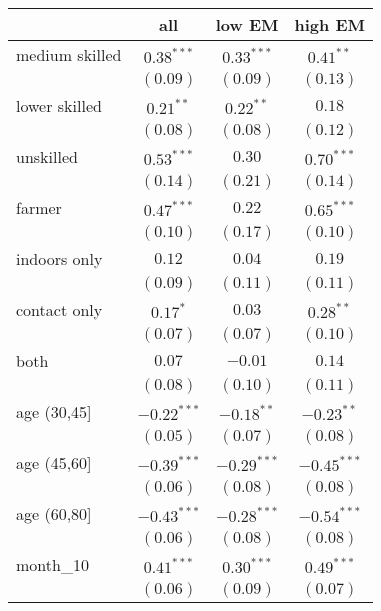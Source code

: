 
\begin{table}[h!]
\begin{center}
\begin{small}
\begin{tabular}{l c c c}
\hline
 & all & low EM & high EM \\
\hline
medium skilled & $0.38^{***}$  & $0.33^{***}$  & $0.41^{**}$   \\
               & $(0.09)$      & $(0.09)$      & $(0.13)$      \\
lower skilled  & $0.21^{**}$   & $0.22^{**}$   & $0.18$        \\
               & $(0.08)$      & $(0.08)$      & $(0.12)$      \\
unskilled      & $0.53^{***}$  & $0.30$        & $0.70^{***}$  \\
               & $(0.14)$      & $(0.21)$      & $(0.14)$      \\
farmer         & $0.47^{***}$  & $0.22$        & $0.65^{***}$  \\
               & $(0.10)$      & $(0.17)$      & $(0.10)$      \\
indoors only   & $0.12$        & $0.04$        & $0.19$        \\
               & $(0.09)$      & $(0.11)$      & $(0.11)$      \\
contact only   & $0.17^{*}$    & $0.03$        & $0.28^{**}$   \\
               & $(0.07)$      & $(0.07)$      & $(0.10)$      \\
both           & $0.07$        & $-0.01$       & $0.14$        \\
               & $(0.08)$      & $(0.10)$      & $(0.11)$      \\
age (30,45]    & $-0.22^{***}$ & $-0.18^{**}$  & $-0.23^{**}$  \\
               & $(0.05)$      & $(0.07)$      & $(0.08)$      \\
age (45,60]    & $-0.39^{***}$ & $-0.29^{***}$ & $-0.45^{***}$ \\
               & $(0.06)$      & $(0.08)$      & $(0.08)$      \\
age (60,80]    & $-0.43^{***}$ & $-0.28^{***}$ & $-0.54^{***}$ \\
               & $(0.06)$      & $(0.08)$      & $(0.08)$      \\
month\_10      & $0.41^{***}$  & $0.30^{***}$  & $0.49^{***}$  \\
               & $(0.06)$      & $(0.09)$      & $(0.07)$      \\

\end{tabular}
\end{small}
\end{center}
\end{table}
